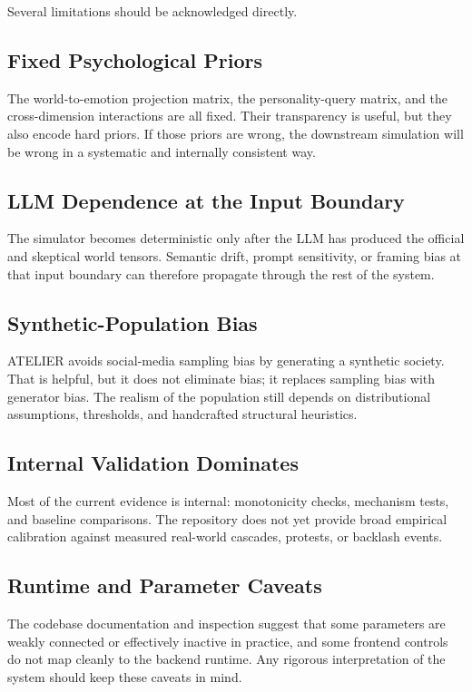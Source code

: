 \documentclass[12pt]{IEEEtran}
\begin{document}
Several limitations should be acknowledged directly.

\subsection{Fixed Psychological Priors}

The world-to-emotion projection matrix, the personality-query matrix, and the cross-dimension interactions are all fixed. Their transparency is useful, but they also encode hard priors. If those priors are wrong, the downstream simulation will be wrong in a systematic and internally consistent way.

\subsection{LLM Dependence at the Input Boundary}

The simulator becomes deterministic only after the LLM has produced the official and skeptical world tensors. Semantic drift, prompt sensitivity, or framing bias at that input boundary can therefore propagate through the rest of the system.

\subsection{Synthetic-Population Bias}

ATELIER avoids social-media sampling bias by generating a synthetic society. That is helpful, but it does not eliminate bias; it replaces sampling bias with generator bias. The realism of the population still depends on distributional assumptions, thresholds, and handcrafted structural heuristics.

\subsection{Internal Validation Dominates}

Most of the current evidence is internal: monotonicity checks, mechanism tests, and baseline comparisons. The repository does not yet provide broad empirical calibration against measured real-world cascades, protests, or backlash events.

\subsection{Runtime and Parameter Caveats}

The codebase documentation and inspection suggest that some parameters are weakly connected or effectively inactive in practice, and some frontend controls do not map cleanly to the backend runtime. Any rigorous interpretation of the system should keep these caveats in mind.
\end{document}
